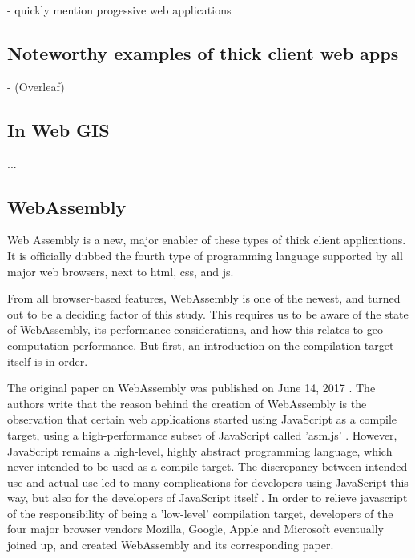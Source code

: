 - quickly mention progessive web applications

\subsection*{Noteworthy examples of thick client web apps}

- (Overleaf)

\subsection{In Web GIS}
\label{sec:background-webgis}

...

\subsection{WebAssembly}
\label{sec:background-wasm}

Web Assembly is a new, major enabler of these types of thick client applications.
It is officially dubbed the fourth type of programming language supported by all major web browsers, next to html, css, and js.

From all browser-based features, WebAssembly is one of the newest, and turned out to be a deciding factor of this study. This requires us to be aware of the state of WebAssembly, its performance considerations, and how this relates to geo-computation performance. But first, an introduction on the compilation target itself is in order.

The original paper on WebAssembly was published on June 14, 2017 \cite{haas_bringing_2017}. The authors write that the reason behind the creation of WebAssembly is the observation that certain web applications started using JavaScript as a compile target, using a high-performance subset of JavaScript called 'asm.js' \cite{mozilla_asmjs_2013}. However, JavaScript remains a high-level, highly abstract programming language, which never intended to be used as a compile target. The discrepancy between intended use and actual use led to many complications for developers using JavaScript this way, but also for the developers of JavaScript itself \cite{haas_bringing_2017}. 
In order to relieve javascript of the responsibility of being a 'low-level' compilation target, developers of the four major browser vendors Mozilla, Google, Apple and Microsoft eventually joined up, and created WebAssembly and its corresponding paper.


